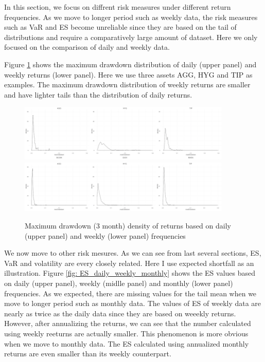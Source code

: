 \documentclass[12pt]{article}
\begin{document}
In this section, we focus on diffrent risk measures under different return frequencies. As we move to longer period such as weekly data, the risk measures such as VaR and ES become unreliable since they are based on the tail of distributions and require a comparatively large amount of dataset. Here we only focused on the comparison of daily and weekly data. 

Figure \ref{fig: mdd_dist_daily_weekly} shows the maximum drawdown distribution of daily (upper panel) and weekly returns (lower panel). Here we use three assets AGG, HYG and TIP as examples. The maximum drawdown distribution of weekly returns are smaller and have lighter tails than the distribution of daily returns.

\begin{figure}[h]
\caption{Maximum drawdown (3 month) density of returns based on daily (upper panel) and weekly (lower panel) frequencies} 
\centering 
\includegraphics[width=0.9\textwidth]{../figures/maxDrawdown_CED/daily_mdd}
\includegraphics[width=0.9\textwidth]{../figures/maxDrawdown_CED/weekly_mdd}
\label{fig: mdd_dist_daily_weekly}
\end{figure}

We now move to other risk mesures. As we can see from last several sections, ES, VaR and volatility are every closely related. Here I use expected shortfall as an illustration. Figure \ref{fig: ES_daily_weekly_monthly} shows the ES values based on daily (upper panel), weekly (midlle panel) and monthly (lower panel) frequencies. As we expected, there are missing values for the tail mean when we move to longer period such as monthly data. The values of ES of weekly data are nearly as twice as the daily data since they are based on weeekly returns. However, after annualizing the returns, we can see that the number calculated using weekly reeturns are actually smaller. This phenomenon is more obvious when we move to monthly data. The ES calculated using annualized monthly returns are even smaller than its weekly counterpart.
\end{document}
